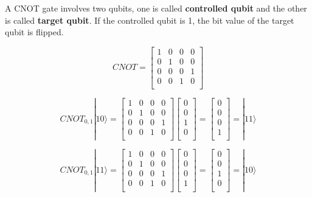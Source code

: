 A CNOT gate involves two qubits, one is called \textbf{controlled qubit} and the other is called \textbf{target qubit}.  If the controlled qubit is 1, the bit value of the target qubit is flipped.

$$ CNOT = \begin{bmatrix}
1 & 0 & 0 & 0 \\
0 & 1 & 0 & 0 \\
0 & 0 & 0 & 1 \\
0 & 0 & 1 & 0 \\
\end{bmatrix}
$$

$$CNOT_{0,1}|10\rangle = 
\begin{bmatrix}
1 & 0 & 0 & 0 \\
0 & 1 & 0 & 0 \\
0 & 0 & 0 & 1 \\
0 & 0 & 1 & 0 \\
\end{bmatrix}
 \left[
\begin{array}{c}
0 \\
0 \\
1 \\
0 \\
\end{array}
\right]
=  \left[
\begin{array}{c}
0 \\
0 \\
0 \\
1 \\
\end{array}
\right] 
= |11\rangle 
$$

$$CNOT_{0,1}|11\rangle = 
\begin{bmatrix}
1 & 0 & 0 & 0 \\
0 & 1 & 0 & 0 \\
0 & 0 & 0 & 1 \\
0 & 0 & 1 & 0 \\
\end{bmatrix}
 \left[
\begin{array}{c}
0 \\
0 \\
0 \\
1 \\
\end{array}
\right]
=  \left[
\begin{array}{c}
0 \\
0 \\
1 \\
0 \\
\end{array}
\right] 
= |10\rangle 
$$

